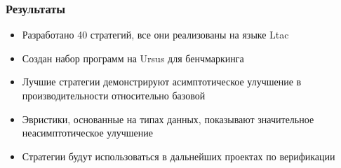 \documentclass{beamer}
\begin{document}
\begin{frame}\frametitle{Результаты}
\begin{itemize}
    \item Разработано 40 стратегий, все они реализованы на языке Ltac
    \item Создан набор программ на Ursus для бенчмаркинга
    \item Лучшие стратегии демонстрируют асимптотическое улучшение в производительности относительно базовой
    \item Эвристики, основанные на типах данных, показывают значительное неасимптотическое улучшение
    \item Стратегии будут использоваться в дальнейших проектах по верификации
\end{itemize}
\end{frame}
\end{document}
